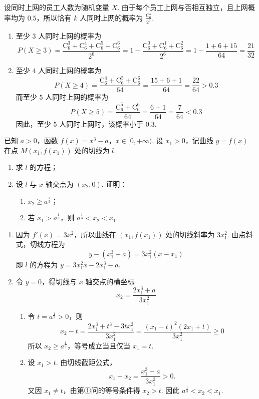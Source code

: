 \begin{solution}
设同时上网的员工人数为随机变量 \(X\). 由于每个员工上网与否相互独立，且上网概率均为 \(0.5\)，所以恰有 \(k\) 人同时上网的概率为 \(\frac{\mathrm C_6^k}{2^6}\).
\begin{enumerate}
\item 至少 \(3\) 人同时上网的概率为
\[
P(X\geqslant3)=\frac{\mathrm C_6^3+\mathrm C_6^4+\mathrm C_6^5+\mathrm C_6^6}{2^6}=1-\frac{\mathrm C_6^0+\mathrm C_6^1+\mathrm C_6^2}{2^6}=1-\frac{1+6+15}{64}=\frac{21}{32}
\]
\item 至少 \(4\) 人同时上网的概率为
\[
P(X\geqslant4)=\frac{\mathrm C_6^4+\mathrm C_6^5+\mathrm C_6^6}{64}=\frac{15+6+1}{64}=\frac{22}{64}>0.3
\]
而至少 \(5\) 人同时上网的概率为
\[
P(X\geqslant5)=\frac{\mathrm C_6^5+\mathrm C_6^6}{64}=\frac{6+1}{64}=\frac{7}{64}<0.3
\]
因此，至少 \(5\) 人同时上网时，该概率小于 \(0.3\).
\end{enumerate}
\end{solution}

\begin{problem}
已知 \(a>0\)，函数 \(f(x)=x^3-a\)，\(x\in[0,+\infty)\). 设 \(x_1>0\)，记曲线 \(y=f(x)\) 在点 \(M(x_1,f(x_1))\) 处的切线为 \(l\).

\begin{enumerate}
\item 求 \(l\) 的方程；
\item 设 \(l\) 与 \(x\) 轴交点为 \((x_{2}, 0)\). 证明：
\begin{enumerate}
\item \(x_{2} \geqslant a^{\frac{1}{3}}\)；
\item 若 \(x_{1} > a^{\frac{1}{3}}\)，则 \(a^{\frac{1}{3}} < x_{2} < x_{1}\).
\end{enumerate}
\end{enumerate}
\end{problem}

\begin{solution}
\begin{enumerate}
\item 因为 \(f'(x)=3x^2\)，所以曲线在 \((x_1,f(x_1))\) 处的切线斜率为 \(3x_1^2\). 由点斜式，切线方程为
\[
y-(x_1^3-a)=3x_1^2(x-x_1)
\]
即 \(l\) 的方程为 \(y=3x_1^2x-2x_1^3-a\).
\item 令 \(y=0\)，得切线与 \(x\) 轴交点的横坐标
\[
x_2=\frac{2x_1^3+a}{3x_1^2}
\]
\begin{enumerate}
\item 令 \(t=a^{\frac{1}{3}}>0\)，则
\[
x_2-t=\frac{2x_1^3+t^3-3tx_1^2}{3x_1^2}=\frac{(x_1-t)^2(2x_1+t)}{3x_1^2}\geqslant0
\]
所以 \(x_2\geqslant a^{\frac{1}{3}}\)，等号成立当且仅当 \(x_1=t\).
\item 设 \(x_1>t\). 由切线截距公式，
\[
x_1-x_2=\frac{x_1^3-a}{3x_1^2}>0.
\]
又因 \(x_1\ne t\)，由第①问的等号条件得 \(x_2>t\). 因此 \(a^{\frac13}<x_2<x_1\).
\end{enumerate}
\end{enumerate}
\end{solution}

